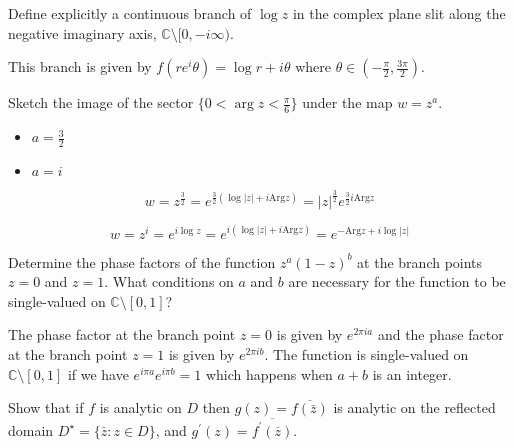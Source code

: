 \documentclass[letter,12pt]{article}
\date{\today}
\begin{document}
\pagestyle{fancy}
\begin{tcolorbox}
   Define explicitly a continuous branch of $\log z$ in the complex plane slit along the negative imaginary axis, $\mathbb{C}\setminus[0,-i\infty).$
\end{tcolorbox}

This branch is given by $f(re^i\theta)=\log r+i\theta$ where $\theta \in (-\frac{\pi}{2},\frac{3\pi}{2})$.


\begin{tcolorbox}
    Sketch the image of the sector $\{0<\arg z<\frac{\pi}{6}\}$ under the map $w=z^a$. \begin{itemize}
        \item $a=\frac{3}{2}$
        \item $a=i$
    \end{itemize}
\end{tcolorbox}

$$w=z^\frac{3}{2}=e^{\frac{3}{2}(\log|z|+i\text{Arg}z)}=|z|^\frac{3}{2}e^{\frac{3}{2}i\text{Arg}z}$$





$$w=z^i=e^{i \log z}=e^{i(\log|z|+i\text{Arg}z)}=e^{-\text{Arg}z+i\log|z|}$$






\begin{tcolorbox}
    Determine the phase factors of the function $z^a(1-z)^b$ at the branch points $z=0$ and $z=1$. What conditions on $a$ and $b$ are necessary for the function to be single-valued on $\mathbb{C}\setminus [0,1]$?
\end{tcolorbox}

The phase factor at the branch point $z=0$ is given by $e^{2\pi i a}$ and the phase factor at the branch point $z=1$ is given by $e^{2\pi i b}$. The function is single-valued on $\mathbb{C}\setminus [0,1]$ if we have $e^{i\pi a}e^{i \pi b}=1$ which happens when $a+b$ is an integer.

\begin{tcolorbox}
    Show that if $f$ is analytic on $D$ then $g(z)=\overline{f(\bar z)}$ is analytic on the reflected domain $D^\star=\{\bar z: z \in D\}$, and $g^\prime(z)=\overline{f^\prime (\overline z)}$.
\end{tcolorbox}
\end{document}
